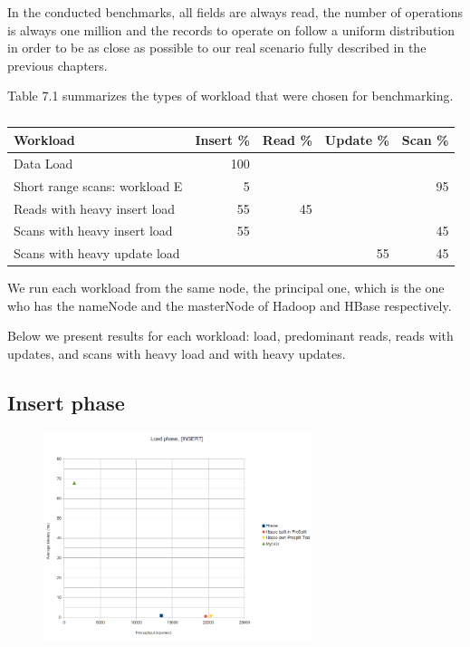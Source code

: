 \bigskip

In the conducted benchmarks, all fields are always read, the number of operations is always one million and the records to operate on follow a uniform distribution in order to be as close as possible to our real scenario fully described in the previous chapters.



Table 7.1 summarizes the types of workload that were chosen for benchmarking.

\begin{table}[htbp]
\caption{}
\begin{tabular}{|l|r|l|l|l|}
\hline
Workload & \multicolumn{1}{l|}{ Insert \% } & Read \%  & Update \%  & Scan \% \\ \hline
Data Load  & 100 &  &  &  \\ \hline
Short range scans: workload E  & 5 &  &  & \multicolumn{1}{r|}{95} \\ \hline
Reads with heavy insert load  & 55 & \multicolumn{1}{r|}{45} &  &  \\ \hline
Scans with heavy insert load  & 55 &  &  & \multicolumn{1}{r|}{45} \\ \hline
Scans with heavy update load & \multicolumn{1}{l|}{} &  & \multicolumn{1}{r|}{55} & \multicolumn{1}{r|}{45} \\ \hline
\end{tabular}
\label{Table 1 YCSB Workloads.}
\end{table}

We run each workload from the same node, the principal one, which is the one who has the nameNode and the masterNode of Hadoop and HBase respectively.

Below we present results for each workload: load, predominant reads, reads with updates, and scans with heavy load and with heavy updates.








\subsection{Insert phase}


\begin{figure}[htb]
\centering
\includegraphics[width=0.7\textwidth]{./images/load.png}
 \label{fig:load}
\caption{}
\end{figure}


